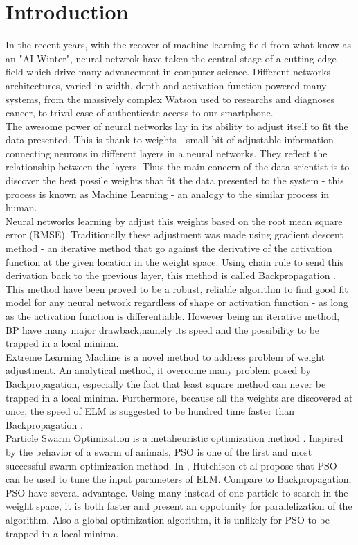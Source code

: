 \documentclass[13pt]{article}
\begin{document}
\section{Introduction}
In the recent years, with the recover of machine learning field from what know as an "AI Winter", neural netwrok have taken the central stage of a cutting edge field which drive many advancement in computer science. Different networks architectures, varied in width, depth and activation function powered many systems, from the massively complex Watson used to researchs and diagnoses cancer, to trival case of authenticate access to our smartphone.\\
The awesome power of neural networks lay in its ability to adjust itself to fit the data presented. This is thank to weights - small bit of adjustable information connecting neurons in different layers in a neural networks. They reflect the relationship between the layers. Thus the main concern of the data scientist is to discover the best possile weights that fit the data presented to the system - this process is known as Machine Learning - an analogy to the similar process in human.\\
Neural networks learning by adjust this weights based on the root mean square error (RMSE). Traditionally these adjustment was made using gradient descent method - an iterative method that go against the derivative of the activation function at the given location in the weight space. Using chain rule to send this derivation back to the previous layer, this method is called Backpropagation \cite{lecun_theoretical_1992}. This method have been proved to be a robust, reliable algorithm to find good fit model for any neural network regardless of shape or activation function - as long as the activation function is differentiable. However being an iterative method, BP have many major drawback,namely its speed and the possibility to be trapped in a local minima.\\
Extreme Learning Machine \cite{huang_extreme_2016} is a novel method to address problem of weight adjustment. An analytical method, it overcome many problem posed by Backpropagation, especially the fact that least square method can never be trapped in a local minima. Furthermore, because all the weights are discovered at once, the speed of ELM is suggested to be hundred time faster than Backpropagation \cite{huang_extreme_2016}.\\
Particle Swarm Optimization is a metaheuristic optimization method \cite{eberhart_new_1995}. Inspired by the behavior of a swarm of animals, PSO is one of the first and most successful swarm optimization method. In \cite{hutchison_evolutionary_2006}, Hutchison et al propose that PSO can be used to tune the input parameters of ELM. Compare to Backpropagation, PSO have several advantage. Using many instead of one particle to search in the weight space, it is both faster and present an oppotunity for parallelization of the algorithm. Also a global optimization algorithm, it is unlikely for PSO to be trapped in a local minima.
\newpage
\end{document}

